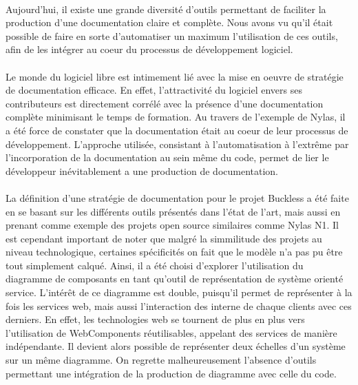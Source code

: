 \paragraph{}
    Aujourd'hui, il existe une grande diversité d'outils permettant de faciliter la production d'une
    documentation claire et complète. Nous avons vu qu'il était possible de faire en sorte d'automatiser
    un maximum l'utilisation de ces outils, afin de les intégrer au coeur du processus de développement
    logiciel.

\paragraph{}
    Le monde du logiciel libre est intimement lié avec la mise en oeuvre de stratégie de documentation
    efficace. En effet, l'attractivité du logiciel envers ses contributeurs est directement corrélé
    avec la présence d'une documentation complète minimisant le temps de formation.
    Au travers de l'exemple de Nylas, il a été force de constater que la documentation était au coeur
    de leur processus de développement. L'approche utilisée, consistant à l'automatisation à l'extrême
    par l'incorporation de la documentation au sein même du code, permet de lier le développeur
    inévitablement a une production de documentation.

\paragraph{}
    La définition d'une stratégie de documentation pour le projet Buckless a été faite en se basant
    sur les différents outils présentés dans l'état de l'art, mais aussi en prenant comme exemple
    des projets open source similaires comme Nylas N1. Il est cependant important de noter que malgré
    la simmilitude des projets au niveau technologique, certaines spécificités on fait que le modèle
    n'a pas pu être tout simplement calqué. Ainsi, il a été choisi d'explorer l'utilisation du
    diagramme de composants en tant qu'outil de représentation de système orienté service.
    L'intérêt de ce diagramme est double, puisqu'il permet de représenter à la fois les services
    web, mais aussi l'interaction des interne de chaque clients avec ces derniers.
    En effet, les technologies web se tournent de plus en plus vers l'utilisation de WebComponents
    réutilisables, appelant des services de manière indépendante. Il devient alors possible de représenter
    deux échelles d'un système sur un même diagramme. On regrette malheureusement l'absence d'outils
    permettant une intégration de la production de diagramme avec celle du code.